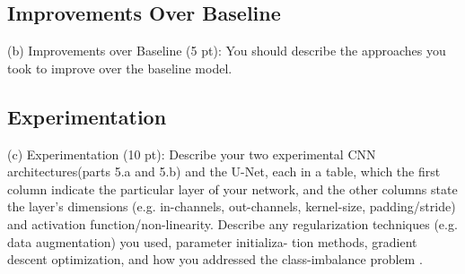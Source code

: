 \subsection*{Improvements Over Baseline}
(b) Improvements over Baseline (5 pt): You should describe the approaches you took to improve over the baseline model.
\subsection*{Experimentation}

(c) Experimentation (10 pt): Describe your two experimental CNN architectures(parts 5.a and 5.b) and the U-Net, each in a table, which the first column indicate the particular layer of your network, and the other columns state the layer’s dimensions (e.g. in-channels, out-channels, kernel-size, padding/stride) and activation function/non-linearity. Describe any regularization techniques (e.g. data augmentation) you used, parameter initializa- tion methods, gradient descent optimization, and how you addressed the class-imbalance problem .

